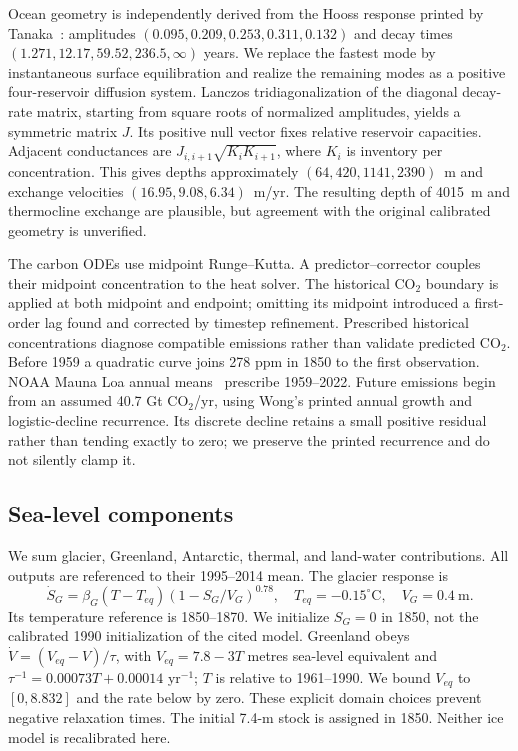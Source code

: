 \documentclass[11pt]{article}
\begin{document}
Ocean geometry is independently derived from the Hooss response printed by
Tanaka\ \cite{tanaka}: amplitudes $(0.095,0.209,0.253,0.311,0.132)$ and decay
times $(1.271,12.17,59.52,236.5,\infty)$ years. We replace the fastest mode by
instantaneous surface equilibration and realize the remaining modes as a
positive four-reservoir diffusion system. Lanczos tridiagonalization of the
diagonal decay-rate matrix, starting from square roots of normalized
amplitudes, yields a symmetric matrix $J$. Its positive null vector fixes
relative reservoir capacities. Adjacent conductances are
$J_{i,i+1}\sqrt{K_iK_{i+1}}$, where $K_i$ is inventory per concentration.
This gives depths approximately $(64,420,1141,2390)$~m and exchange velocities
$(16.95,9.08,6.34)$~m/yr. The resulting depth of 4015~m and thermocline exchange
are plausible, but agreement with the original calibrated geometry is unverified.

The carbon ODEs use midpoint Runge--Kutta. A predictor--corrector couples their
midpoint concentration to the heat solver. The historical CO$_2$ boundary is
applied at both midpoint and endpoint; omitting its midpoint introduced a
first-order lag found and corrected by timestep refinement. Prescribed
historical concentrations diagnose compatible emissions rather than validate
predicted CO$_2$. Before 1959 a quadratic curve joins 278 ppm in 1850 to the
first observation. NOAA Mauna Loa annual means\ \cite{noaa} prescribe 1959--2022.
Future emissions begin from an assumed 40.7 Gt CO$_2$/yr, using Wong's printed
annual growth and logistic-decline recurrence. Its discrete decline retains
a small positive residual rather than tending exactly to zero; we preserve
the printed recurrence and do not silently clamp it.

\subsection{Sea-level components}
We sum glacier, Greenland, Antarctic, thermal, and land-water contributions.
All outputs are referenced to their 1995--2014 mean. The glacier response
\cite{brick} is
\begin{equation}
\dot S_G=\beta_G(T-T_{eq})(1-S_G/V_G)^{0.78},
\quad T_{eq}=-0.15^\circ\mathrm C,\quad V_G=0.4~\mathrm m.
\end{equation}
Its temperature reference is 1850--1870. We initialize $S_G=0$ in 1850, not
the calibrated 1990 initialization of the cited model. Greenland obeys
$\dot V=(V_{eq}-V)/\tau$, with $V_{eq}=7.8-3T$ metres sea-level equivalent
and $\tau^{-1}=0.00073T+0.00014$ yr$^{-1}$; $T$ is relative to 1961--1990.
We bound $V_{eq}$ to $[0,8.832]$ and the rate below by zero. These explicit
domain choices prevent negative relaxation times. The initial 7.4-m stock
is assigned in 1850. Neither ice model is recalibrated here.
\end{document}
